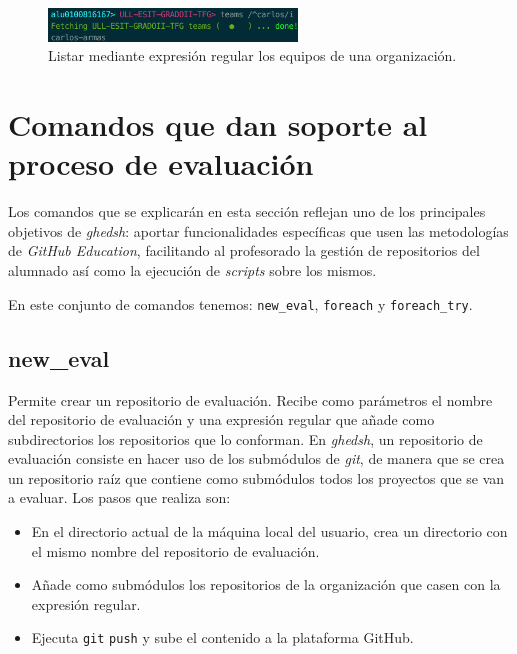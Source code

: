\begin{figure}[H]
	\begin{center}
	\includegraphics[width=0.59\textwidth]{images/org-regexp-teams.png}
	\caption{Listar mediante expresión regular los equipos de una organización.}
	\label{fig:org-regexp-teams}
	\end{center}
\end{figure}

\section{Comandos que dan soporte al proceso de evaluación}
\label{3:sec:4}

Los comandos que se explicarán en esta sección reflejan uno de los principales objetivos de {\it ghedsh}: aportar funcionalidades específicas
que usen las metodologías de {\it GitHub Education}, facilitando al profesorado la gestión de repositorios del alumnado así como la ejecución de {\it scripts} sobre los mismos.
\bigskip

En este conjunto de comandos tenemos: \verb|new_eval|, \verb|foreach| y \verb|foreach_try|.

\subsection{new\_eval}
\label{3.4.1}

Permite crear un repositorio de evaluación. Recibe como parámetros el nombre del repositorio de evaluación y una expresión regular que añade como subdirectorios los repositorios que lo conforman. En {\it ghedsh}, un repositorio de evaluación consiste en hacer uso de los submódulos de {\it git}, de manera que se crea un repositorio raíz que contiene como submódulos
todos los proyectos que se van a evaluar. Los pasos que realiza son:
\begin{itemize}
	\item En el directorio actual de la máquina local del usuario, crea un directorio con el mismo nombre del repositorio de evaluación.
	\item Añade como submódulos los repositorios de la organización que casen con la expresión regular.
	\item Ejecuta \verb|git| \verb|push|  y sube el contenido a la plataforma GitHub.
\end{itemize}
\bigskip

